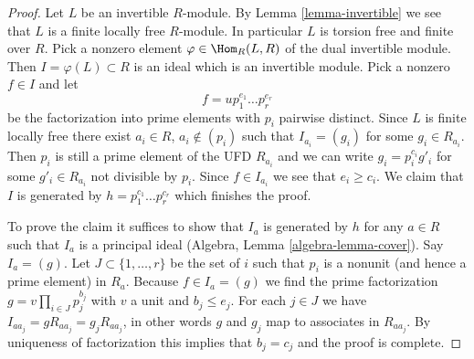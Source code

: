 \begin{proof}
Let $L$ be an invertible $R$-module. By Lemma \ref{lemma-invertible}
we see that $L$ is a finite locally free $R$-module. In particular
$L$ is torsion free and finite over $R$. Pick a nonzero element
$\varphi \in \Hom_R(L, R)$ of the dual invertible module.
Then $I = \varphi(L) \subset R$ is an ideal which is an invertible module.
Pick a nonzero $f \in I$ and let
$$
f = u p_1^{e_1} \ldots p_r^{e_r}
$$
be the factorization into prime elements with $p_i$ pairwise distinct.
Since $L$ is finite locally free there exist $a_i \in R$,
$a_i \not \in (p_i)$ such that $I_{a_i} = (g_i)$ for some $g_i \in R_{a_i}$.
Then $p_i$ is still a prime element of the UFD $R_{a_i}$ and
we can write $g_i = p_i^{c_i} g'_i$ for some $g'_i \in R_{a_i}$
not divisible by $p_i$. Since $f \in I_{a_i}$ we see that $e_i \geq c_i$.
We claim that $I$ is generated by $h = p_1^{c_1} \ldots p_r^{c_r}$ which
finishes the proof.

\medskip\noindent
To prove the claim it suffices to show that $I_a$ is generated by $h$
for any $a \in R$ such that $I_a$ is a principal ideal
(Algebra, Lemma \ref{algebra-lemma-cover}). Say $I_a = (g)$.
Let $J \subset \{1, \ldots, r\}$ be the set of $i$ such that
$p_i$ is a nonunit (and hence a prime element) in $R_a$. Because
$f \in I_a = (g)$ we find the prime factorization
$g = v \prod_{i \in J} p_j^{b_j}$
with $v$ a unit and $b_j \leq e_j$. For each $j \in J$ we have
$I_{aa_j} = g R_{aa_j} = g_j R_{aa_j}$, in other words
$g$ and $g_j$ map to associates in $R_{aa_j}$. By uniqueness
of factorization this implies that $b_j = c_j$ and the proof is complete.
\end{proof}







